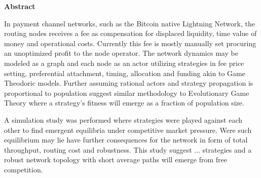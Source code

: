 \centering \textbf{Abstract}

In payment channel networks, such as the Bitcoin native Lightning Network, the routing
nodes receives a fee as compensation for displaced liquidity, time value of money and operational
costs. Currently this fee is mostly manually set procuring an unoptimized profit to
the node operator. The network dynamics may be modeled as a graph and each node as an actor
utilizing strategies in fee price setting, preferential attachment, timing, allocation and
funding akin to Game Theodoric models. Further assuming rational actors and strategy propagation is  
proportional to population suggest similar methodology to Evolutionary Game Theory where
a strategy's fitness will emerge as a fraction of population size.
		
A simulation study was performed where strategies were played against each other to find emergent equilibria under competitive market pressure. Were such equilibrium may lie have further consequences for the network in form of total throughput, routing cost and robustness. This study suggest ... strategies and a robust network topology with short average paths will emerge from free competition.
